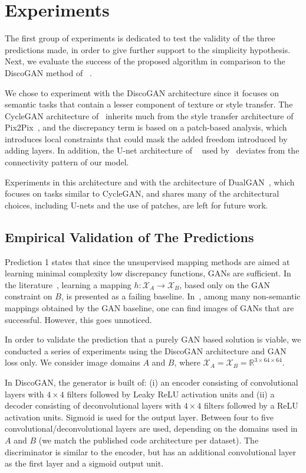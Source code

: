 \documentclass{article} %
\begin{document}
\section{Experiments}
\label{sec:experiments}

The first group of experiments is dedicated to test the validity of the three predictions made, in order to give further support to the simplicity hypothesis. Next, we evaluate the success of the proposed algorithm in comparison to the DiscoGAN method of ~\cite{discogan}.

We chose to experiment with the DiscoGAN architecture since it focuses on semantic tasks that contain a lesser component of texture or style transfer. The CycleGAN architecture of~\cite{CycleGAN2017} inherits much from the style transfer architecture of Pix2Pix~\cite{pix2pix}, and the discrepancy term is based on a patch-based analysis, which introduces local constraints that could mask the added freedom introduced by adding layers. In addition, the U-net architecture of ~\cite{unet} used by~\cite{pix2pix} deviates from the connectivity pattern of our model. 

Experiments in this architecture and with the architecture of DualGAN~\citep{dualgan}, which focuses on tasks similar to CycleGAN, and shares many of the architectural choices,  including U-nets and the use of patches, are left for future work.

\subsection{Empirical Validation of The Predictions}

Prediction 1 states that since the unsupervised mapping methods are aimed at learning minimal complexity low discrepancy functions, GANs are sufficient. In the literature~\citep{CycleGAN2017,discogan}, learning a mapping $h:\mathcal{X}_A\rightarrow \mathcal{X}_B$, based only on the GAN constraint on $B$, is presented as a failing baseline. In~\citep{dualgan}, among many non-semantic mappings obtained by the GAN baseline, one can find images of GANs that are successful. However, this goes unnoticed.

In order to validate the prediction that a purely GAN based solution is viable, we conducted a series of experiments using the DiscoGAN architecture and GAN loss only. We consider image domains $A$ and $B$, where $\mathcal{X}_A = \mathcal{X}_B = \mathbb{R}^{3\times 64\times 64}$.  

In DiscoGAN, the generator is built of: (i) an encoder consisting of convolutional layers with $4\times 4$ filters followed by Leaky ReLU activation units and (ii) a decoder consisting of deconvolutional layers with $4\times 4$ filters followed by a ReLU activation units. Sigmoid is used for the output layer. Between four to five convolutional/deconvolutional layers are used, depending on the domains used in $A$ and $B$ (we match the published code architecture per dataset). The discriminator is similar to the encoder, but has an additional convolutional layer as the first layer and a sigmoid output unit. 
\end{document}
